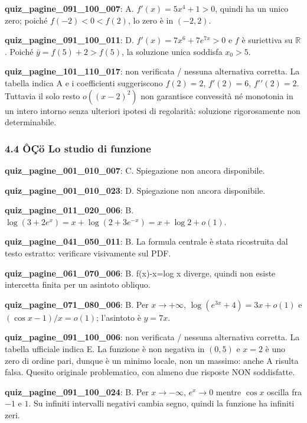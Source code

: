 \documentclass[11pt,a4paper]{article}
\newcounter{quiz}
\begin{document}
\noindent\textbf{quiz\_pagine\_091\_100\_007}: A. $f\prime(x)=5x^4+1>0$, quindi ha un unico zero; poiché $f(-2)<0<f(2)$, lo zero è in $(-2,2)$.\par\medskip
\noindent\textbf{quiz\_pagine\_091\_100\_011}: D. $f\prime(x)=7x^6+7e^{7x}>0$ e $f$ è suriettiva su $\mathbb R$. Poiché $\bar y=f(5)+2>f(5)$, la soluzione unica soddisfa $x_0>5$.\par\medskip
\noindent\textbf{quiz\_pagine\_101\_110\_017}: non verificata / nessuna alternativa corretta. La tabella indica A e i coefficienti suggeriscono $f(2)=2$, $f\prime(2)=6$, $f\prime\prime(2)=2$. Tuttavia il solo resto $o((x-2)^2)$ non garantisce convessità né monotonia in un intero intorno senza ulteriori ipotesi di regolarità: soluzione rigorosamente non determinabile.\par\medskip
\subsubsection*{4.4 ÔÇö Lo studio di funzione}
\noindent\textbf{quiz\_pagine\_001\_010\_007}: C. Spiegazione non ancora disponibile.\par\medskip
\noindent\textbf{quiz\_pagine\_001\_010\_023}: D. Spiegazione non ancora disponibile.\par\medskip
\noindent\textbf{quiz\_pagine\_011\_020\_006}: B. $\log(3+2e^x)=x+\log(2+3e^{-x})=x+\log2+o(1)$.\par\medskip
\noindent\textbf{quiz\_pagine\_041\_050\_011}: B. La formula centrale è stata ricostruita dal testo estratto: verificare visivamente sul PDF.\par\medskip
\noindent\textbf{quiz\_pagine\_061\_070\_006}: B. f(x)-x=log x diverge, quindi non esiste intercetta finita per un asintoto obliquo.\par\medskip
\noindent\textbf{quiz\_pagine\_071\_080\_006}: B. Per $x\to+\infty$, $\log(e^{3x}+4)=3x+o(1)$ e $(\cos x-1)/x=o(1)$; l'asintoto è $y=7x$.\par\medskip
\noindent\textbf{quiz\_pagine\_091\_100\_006}: non verificata / nessuna alternativa corretta. La tabella ufficiale indica E. La funzione è non negativa in $(0,5)$ e $x=2$ è uno zero di ordine pari, dunque è un minimo locale, non un massimo: anche A risulta falsa. Quesito originale problematico, con almeno due risposte NON soddisfatte.\par\medskip
\noindent\textbf{quiz\_pagine\_091\_100\_024}: B. Per $x\to-\infty$, $e^x\to0$ mentre $\cos x$ oscilla fra $-1$ e $1$. Su infiniti intervalli negativi cambia segno, quindi la funzione ha infiniti zeri.\par\medskip
\end{document}
